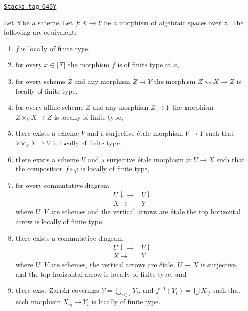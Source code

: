 \begin{lemma}
\label{spaces-morphisms-lemma-finite-type-local}
\href{https://stacks.math.columbia.edu/tag/040Y}{\texttt{Stacks tag 040Y}}

Let $S$ be a scheme.
Let $f : X \to Y$ be a morphism of algebraic spaces over $S$.
The following are equivalent:
\begin{enumerate}
\item $f$ is locally of finite type,
\item for every $x \in |X|$ the morphism $f$ is of finite type at $x$,
\item for every scheme $Z$ and any morphism $Z \to Y$ the morphism
$Z \times_Y X \to Z$ is locally of finite type,
\item for every affine scheme $Z$ and any morphism
$Z \to Y$ the morphism $Z \times_Y X \to Z$ is locally of finite type,
\item there exists a scheme $V$ and a surjective \'etale morphism
$V \to Y$ such that $V \times_Y X \to V$ is locally of finite type,
\item there exists a scheme $U$ and a surjective \'etale morphism
$\varphi : U \to X$ such that the composition $f \circ \varphi$
is locally of finite type,
\item for every commutative diagram
$$
\begin{array}{cc}U \downarrow\longrightarrow & V \downarrow \\ X \longrightarrow & Y\end{array}
$$
where $U$, $V$ are schemes and the vertical arrows are \'etale
the top horizontal arrow is locally of finite type,
\item there exists a commutative diagram
$$
\begin{array}{cc}U \downarrow\longrightarrow & V \downarrow \\ X \longrightarrow & Y\end{array}
$$
where $U$, $V$ are schemes, the vertical arrows are \'etale, $U \to X$
is surjective, and the top horizontal arrow is locally of finite type, and
\item there exist Zariski coverings $Y = \bigcup_{i \in I} Y_i$,
and $f^{-1}(Y_i) = \bigcup X_{ij}$ such that
each morphism $X_{ij} \to Y_i$ is locally of finite type.
\end{enumerate}
\end{lemma}

